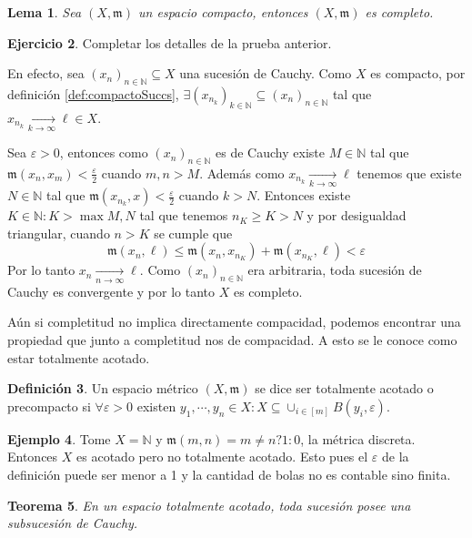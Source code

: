\documentclass[12pt]{article}
\theoremstyle{plain}
\newtheorem{Th}{Teorema}[subsection]   %
\newtheorem{Lem}[Th]{Lema}             %
\theoremstyle{definition}
\newtheorem{Def}[Th]{Definición}       %
\newtheorem{Ex}[Th]{Ejemplo}               %
\newtheorem{Ej}[Th]{Ejercicio}
\theoremstyle{remark}
\numberwithin{equation}{section}
\newcommand{\bN}{\mathbb{N}}        %
\newcommand{\mm}{\mathfrak{m}}      %
\renewcommand{\geq}{\geqslant}      %
\renewcommand{\leq}{\leqslant}      %
\renewcommand{\:}{\colon}           %
\newcommand{\bonj}[1]{\left\lbrack#1\right\rbrack}
\begin{document}
\begin{multicols}{2}
\begin{Lem}
  Sea $(X,\mm)$ un espacio compacto, entonces $(X,\mm)$ es completo.
\end{Lem}

\begin{Ej}
  Completar los detalles de la prueba anterior.
\end{Ej}

\begin{ptcb}
En efecto, sea $(x_n)_{n\in\bN}\subseteq X$ una sucesión de Cauchy. Como $X$ es compacto, por definición \ref{def:compactoSuccs}, $\exists(x_{n_k})_{k\in\bN}\subseteq (x_n)_{n\in\bN}$ tal que $x_{n_k}\xrightarrow[k\to\infty]{}\ell\in X$.\par
Sea $\varepsilon>0$, entonces como $(x_n)_{n\in\bN}$ es de Cauchy existe $M\in\bN$ tal que $\mm(x_n,x_m)<\frac{\varepsilon}{2}$ cuando $m,n>M$. Además como $x_{n_k}\xrightarrow[k\to\infty]{}\ell$ tenemos que existe $N\in\bN$ tal que $\mm(x_{n_k},x)<\frac{\varepsilon}{2}$ cuando $k>N$.
Entonces existe $K\in\bN\colon K>\max{M,N}$ tal que tenemos $n_K\geq K>N$ y por desigualdad triangular, cuando $n> K$ se cumple que
$$\mm(x_n,\ell)\leq \mm(x_n,x_{n_K})+\mm(x_{n_K},\ell)<\varepsilon$$
Por lo tanto $x_n\xrightarrow[n\to\infty]{}\ell$. Como $(x_n)_{n\in\bN}$ era arbitraria, toda sucesión de Cauchy es convergente y por lo tanto $X$ es completo.
\end{ptcb}

Aún si completitud no implica directamente compacidad, podemos encontrar una propiedad que junto a completitud nos de compacidad. A esto se le conoce como estar totalmente acotado.

\begin{Def}
  Un espacio métrico $(X,\mm)$ se dice ser totalmente acotado o precompacto si $\forall\varepsilon>0$ existen $y_1,\cdots,y_n\in X\colon X\subseteq\cup_{i\in\bonj{m}}B(y_i,\varepsilon)$.
\end{Def}

\begin{Ex}
  Tome $X=\bN$ y $\mm(m,n)= m\neq n? 1\colon 0$, la métrica discreta. Entonces $X$ es acotado pero no totalmente acotado. Esto pues el $\varepsilon$ de la definición puede ser menor a 1 y la cantidad de bolas no es contable sino finita.
\end{Ex}

\begin{Th}
  En un espacio totalmente acotado, toda sucesión posee una subsucesión de Cauchy.
\end{Th}


\end{multicols}
\end{document}

